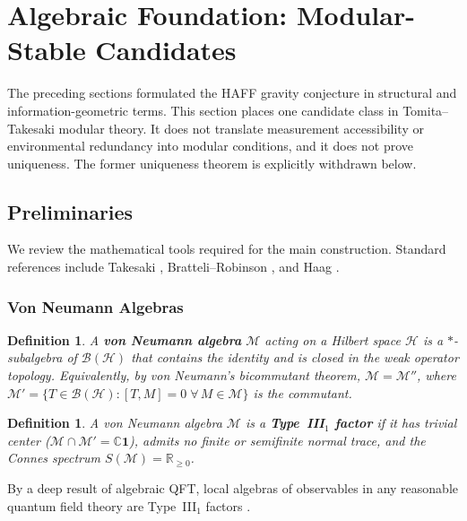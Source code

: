 \documentclass[12pt,a4paper]{article}
\newtheorem{definition}[theorem]{Definition}
\begin{document}
\section{Algebraic Foundation: Modular-Stable Candidates}
\label{sec:modular}

The preceding sections formulated the HAFF gravity conjecture in structural and information-geometric terms.  This section places one candidate class in Tomita--Takesaki modular theory.  It does not translate measurement accessibility or environmental redundancy into modular conditions, and it does not prove uniqueness.  The former uniqueness theorem is explicitly withdrawn below.


\subsection{Preliminaries}
\label{sec:modular-prelim}

We review the mathematical tools required for the main construction. Standard references include Takesaki \cite{Takesaki2003}, Bratteli--Robinson \cite{BratteliRobinson1997}, and Haag \cite{Haag1996}.

\subsubsection{Von Neumann Algebras}

\begin{definition}
A \textbf{von Neumann algebra} $\mathcal{M}$ acting on a Hilbert space $\mathcal{H}$ is a $*$-subalgebra of $\mathcal{B}(\mathcal{H})$ that contains the identity and is closed in the weak operator topology.
Equivalently, by von Neumann's bicommutant theorem, $\mathcal{M} = \mathcal{M}''$, where $\mathcal{M}' = \{T \in \mathcal{B}(\mathcal{H}) : [T, M] = 0 \;\forall\, M \in \mathcal{M}\}$ is the commutant.
\end{definition}

\begin{definition}
A von Neumann algebra $\mathcal{M}$ is a \textbf{Type~III$_1$ factor} if it has trivial center ($\mathcal{M} \cap \mathcal{M}' = \mathbb{C} \mathbf{1}$), admits no finite or semifinite normal trace, and the Connes spectrum $S(\mathcal{M}) = \mathbb{R}_{\geq 0}$.
\end{definition}

By a deep result of algebraic QFT, local algebras of observables in any reasonable quantum field theory are Type~III$_1$ factors \cite{Haag1996, Yngvason2005}.
\end{document}
